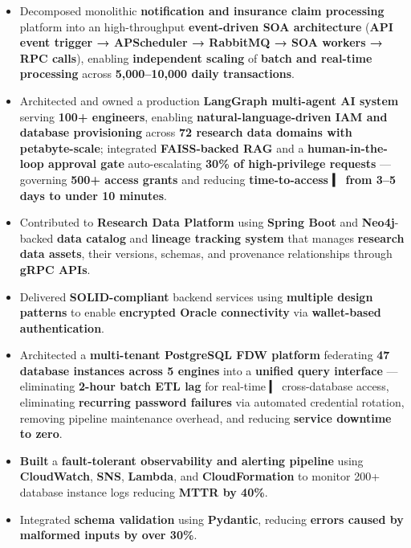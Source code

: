 \documentclass[11 pt]{article}
\begin{document}
\begin{itemize}

\item Decomposed monolithic \textbf{notification and insurance claim processing} platform into an high-throughput \textbf{event-driven SOA architecture} (\textbf{API event trigger → APScheduler → RabbitMQ → SOA workers → RPC calls}), 
  enabling \textbf{independent scaling} of \textbf{batch and real-time processing} across \textbf{5,000--10,000 daily transactions}. 
           
  \item  Architected and owned a production \textbf{LangGraph multi-agent AI system} serving \textbf{100+ engineers}, enabling \textbf{natural-language-driven IAM and database provisioning} across \textbf{72 research data domains with petabyte-scale}; integrated \textbf{FAISS-backed RAG} and a \textbf{human-in-the-loop approval gate} auto-escalating \textbf{30\% of high-privilege requests} --- governing \textbf{500+ access grants} and reducing \textbf{time-to-access  
  ▎ from 3--5 days to under 10 minutes}.    
                                                            
  \item Contributed to \textbf{Research Data Platform} using \textbf{Spring Boot} and \textbf{Neo4j}-backed \textbf{data catalog} and \textbf{lineage tracking system} that manages \textbf{research data assets}, their versions,       
  schemas, and provenance relationships through \textbf{gRPC APIs}.
     
  \item Delivered \textbf{SOLID-compliant} backend services using \textbf{ multiple design patterns} to enable \textbf{encrypted Oracle connectivity} via \textbf{wallet-based authentication}.
  
\item Architected a \textbf{multi-tenant PostgreSQL FDW platform} federating \textbf{47 database instances across 5 engines} into a \textbf{unified query interface} --- eliminating \textbf{2-hour batch ETL lag} for real-time
  ▎ cross-database access, eliminating \textbf{recurring password failures} via automated credential rotation, removing pipeline maintenance overhead, and reducing \textbf{service downtime to zero}.
                                                                                                                                                                                                                                         
  \item \textbf{Built} a \textbf{fault-tolerant observability and alerting pipeline} using \textbf{CloudWatch}, \textbf{SNS}, \textbf{Lambda}, and \textbf{CloudFormation} to monitor 200+ database instance logs reducing \textbf{MTTR by 40\%}.                              
   
  \item Integrated \textbf{schema validation} using \textbf{Pydantic}, reducing \textbf{errors caused by malformed inputs by over 30\%}.

\end{itemize}
\end{document}
